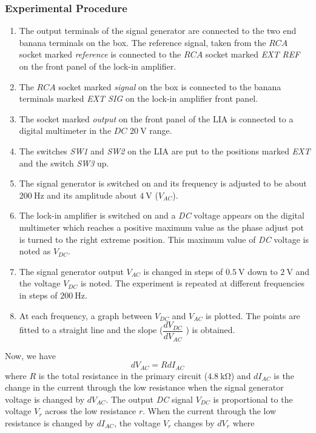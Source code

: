 \documentclass[%
 reprint,
nofootinbib,
 amsmath,amssymb,
 aps,
]{revtex4-2}
\begin{document}
        \subsubsection{Experimental Procedure}
            \begin{enumerate}
                \item The output terminals of the signal generator are connected to the two end banana terminals on the box. The reference signal, taken from the $RCA$ socket marked \textit{reference} is connected to the $RCA$ socket marked \textit{EXT REF} on the front panel of the lock-in amplifier.
                \item The $RCA$ socket marked \textit{signal} on the box is connected to the banana terminals marked \textit{EXT SIG} on the lock-in amplifier front panel.
                \item The socket marked \textit{output} on the front panel of the LIA is connected to a digital multimeter in the $DC$ $\SI{20}{\volt}$ range.
                \item The switches \textit{SW1} and \textit{SW2} on the LIA are put to the positions marked \textit{EXT} and the switch \textit{SW3} up.
                \item The signal generator is switched on and its frequency is adjusted to be about $\SI{200}{\hertz}$ and its amplitude about $\SI{4}{\volt}$ ($V_{AC}$).
                \item The lock-in amplifier is switched on and a \textit{DC} voltage appears on the digital multimeter which reaches a positive maximum value as the phase adjust pot is turned to the right extreme position. This maximum value of \textit{DC} voltage is noted as $V_{DC}$.
                \item The signal generator output $V_{AC}$ is changed in steps of $\SI{0.5}{\volt}$ down to $\SI{2}{\volt}$ and the voltage $V_{DC}$ is noted. The experiment is repeated at different frequencies in steps of $\SI{200}{\hertz}$.
                \item At each frequency, a graph between $V_{DC}$ and $V_{AC}$ is plotted. The points are fitted to a straight line and the slope \Bigg($\dfrac{d V_{DC}}{d V_{AC}}$ \Bigg) is obtained.
            \end{enumerate}
            Now, we have
            \begin{equation}
                d V_{AC} = R d I_{AC}
            \end{equation}
            where $R$ is the total resistance in the primary circuit ($\SI{4.8}{\kilo \ohm}$) and $d I_{AC}$ is the change in the current through the low resistance when the signal generator voltage is changed by $d V_{AC}$. The output \textit{DC} signal $V_{DC}$ is proportional to the voltage $V_r$ across the low resistance $r$. When the current through the low resistance is changed by $d I_{AC}$, the voltage $V_r$ changes by $d V_r$ where
\end{document}
